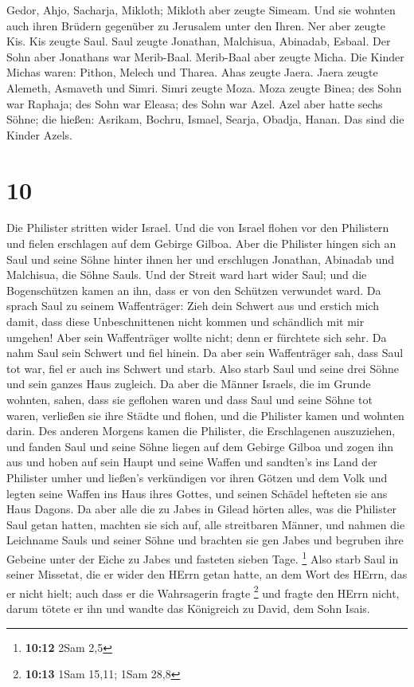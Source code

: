 Gedor, Ahjo, Sacharja, Mikloth;  Mikloth aber zeugte
Simeam. Und sie wohnten auch ihren Brüdern gegenüber zu Jerusalem unter
den Ihren.  Ner aber zeugte Kis. Kis zeugte Saul. Saul
zeugte Jonathan, Malchisua, Abinadab, Esbaal.  Der Sohn
aber Jonathans war Merib-Baal. Merib-Baal aber zeugte Micha.
 Die Kinder Michas waren: Pithon, Melech und Tharea.
 Ahas zeugte Jaera. Jaera zeugte Alemeth, Asmaveth und
Simri. Simri zeugte Moza.  Moza zeugte Binea; des Sohn
war Raphaja; des Sohn war Eleasa; des Sohn war Azel. 
Azel aber hatte sechs Söhne; die hießen: Asrikam, Bochru, Ismael,
Searja, Obadja, Hanan. Das sind die Kinder Azels.

\hypertarget{section-9}{%
\section{10}\label{section-9}}

 Die Philister stritten wider Israel. Und die von Israel
flohen vor den Philistern und fielen erschlagen auf dem Gebirge Gilboa.
 Aber die Philister hingen sich an Saul und seine Söhne
hinter ihnen her und erschlugen Jonathan, Abinadab und Malchisua, die
Söhne Sauls.  Und der Streit ward hart wider Saul; und die
Bogenschützen kamen an ihn, dass er von den Schützen verwundet ward.
 Da sprach Saul zu seinem Waffenträger: Zieh dein Schwert
aus und erstich mich damit, dass diese Unbeschnittenen nicht kommen und
schändlich mit mir umgehen! Aber sein Waffenträger wollte nicht; denn er
fürchtete sich sehr. Da nahm Saul sein Schwert und fiel hinein.
 Da aber sein Waffenträger sah, dass Saul tot war, fiel er
auch ins Schwert und starb.  Also starb Saul und seine
drei Söhne und sein ganzes Haus zugleich.  Da aber die
Männer Israels, die im Grunde wohnten, sahen, dass sie geflohen waren
und dass Saul und seine Söhne tot waren, verließen sie ihre Städte und
flohen, und die Philister kamen und wohnten darin.  Des
anderen Morgens kamen die Philister, die Erschlagenen auszuziehen, und
fanden Saul und seine Söhne liegen auf dem Gebirge Gilboa 
und zogen ihn aus und hoben auf sein Haupt und seine Waffen und
sandten's ins Land der Philister umher und ließen's verkündigen vor
ihren Götzen und dem Volk  und legten seine Waffen ins
Haus ihres Gottes, und seinen Schädel hefteten sie ans Haus Dagons.
 Da aber alle die zu Jabes in Gilead hörten alles, was
die Philister Saul getan hatten,  machten sie sich auf,
alle streitbaren Männer, und nahmen die Leichname Sauls und seiner Söhne
und brachten sie gen Jabes und begruben ihre Gebeine unter der Eiche zu
Jabes und fasteten sieben Tage. \footnote{\textbf{10:12} 2Sam 2,5}
 Also starb Saul in seiner Missetat, die er wider den
HErrn getan hatte, an dem Wort des HErrn, das er nicht hielt; auch dass
er die Wahrsagerin fragte \footnote{\textbf{10:13} 1Sam 15,11; 1Sam 28,8}
 und fragte den HErrn nicht, darum tötete er ihn und
wandte das Königreich zu David, dem Sohn Isais.

